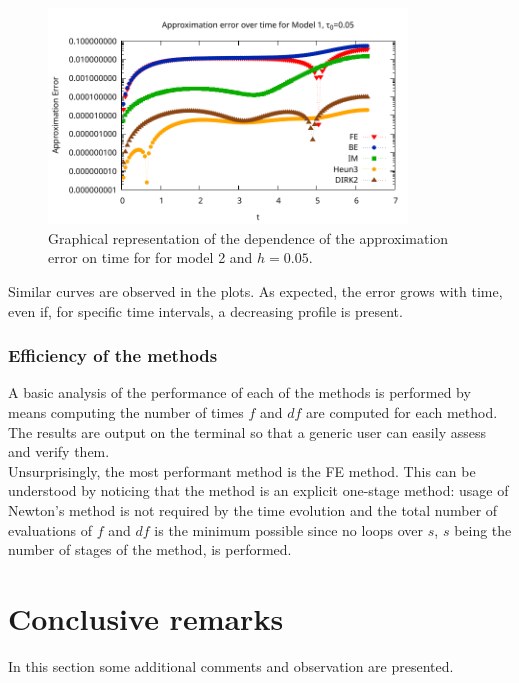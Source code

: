\documentclass[11pt]{article}
\theoremstyle{theorem}
\theoremstyle{definition}
\begin{document}
\begin{figure}[H]
	\begin{center}
		\includegraphics[width=0.85\textwidth]{Err_vs_t_05}
	\end{center}
	\caption{Graphical representation of the dependence of the approximation error on time for for model 2 and $h=0.05$.
		\label{fig:Err_vs_t_0_05}}
\end{figure}

Similar curves are observed in the plots. As expected, the error grows with time, even if, for specific time intervals, a decreasing profile is present.\\

\subsubsection{Efficiency of the methods}
A basic analysis of the performance of each of the methods is performed by means computing the number of times $f$ and $df$ are computed for each method. The results are output on the terminal so that a generic user can easily assess and verify them.\\
Unsurprisingly, the most performant method is the FE method. This can be understood by noticing that the method is an explicit one-stage method: usage of Newton's method is not required by the time evolution and the total number of evaluations of $f$ and $df$ is the minimum possible since no loops over $s$, $s$ being the number of stages of the method, is performed.\\

\section{Conclusive remarks}
In this section some additional comments and observation are presented.
\end{document}
